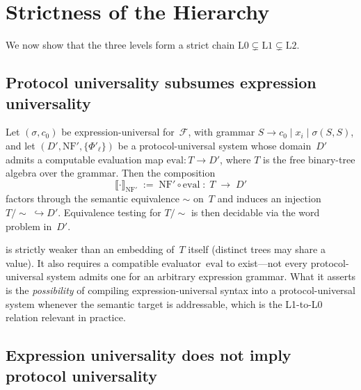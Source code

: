 \section{Strictness of the Hierarchy}\label{sec:strictness}

We now show that the three levels form a strict chain
$\text{L0} \subsetneq \text{L1} \subsetneq \text{L2}$.

\subsection{Protocol universality subsumes expression
  universality}\label{ssec:L1-geq-L0}

\begin{proposition}\label{prop:L1-compiles-L0}
Let $(\sigma, c_{0})$ be expression-universal
for~$\mathcal{F}$, with grammar
$S \to c_{0} \mid x_{i} \mid \sigma(S,S)$, and let
$(D', \mathrm{NF}', \{\Phi'_{\ell}\})$ be a protocol-universal
system whose domain~$D'$ admits a computable evaluation map
$\mathrm{eval} \colon T \to D'$, where $T$ is the free
binary-tree algebra over the grammar.  Then the composition
\[
  \llbracket \cdot \rrbracket_{\mathrm{NF}'}
    \;:=\; \mathrm{NF}' \circ \mathrm{eval}
    \;\colon\; T \;\longrightarrow\; D'
\]
factors through the semantic equivalence $\sim$ on~$T$ and
induces an injection $T/\!\sim\; \hookrightarrow D'$.
Equivalence testing for $T/\!\sim$ is then decidable via the
word problem in~$D'$.
\end{proposition}

\begin{remark}
 is strictly weaker than an embedding
of~$T$ itself (distinct trees may share a value).  It also
requires a compatible evaluator~$\mathrm{eval}$ to exist---not
every protocol-universal system admits one for an arbitrary
expression grammar.  What it asserts is the \emph{possibility}
of compiling expression-universal syntax into a protocol-universal
system whenever the semantic target is addressable, which is the
L1-to-L0 relation relevant in practice.
\end{remark}

\subsection{Expression universality does not imply protocol
  universality}\label{ssec:L0-not-L1}

